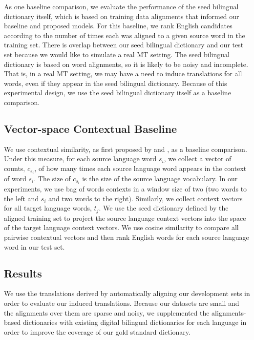 \documentclass[11pt,letterpaper]{article}
\begin{document}
As one baseline comparison, we evaluate the performance of the seed bilingual dictionary itself, which is based on training data alignments that informed our baseline and proposed models.
For this baseline, we rank English candidates according to the number of times each was aligned to a given source word in the training set.
There is overlap between our seed bilingual dictionary and our test set because we would like to simulate a real MT setting.
The seed bilingual dictionary is based on word alignments, so it is likely to be noisy and incomplete. 
That is, in a real MT setting, we may have a need to induce translations for all words, even if they appear in the seed bilingual dictionary.
Because of this experimental design, we use the seed bilingual dictionary itself as a baseline comparison.


\subsection{Vector-space Contextual Baseline}\label{sec:contextbaseline}
We use contextual similarity, as first proposed by  and , as a baseline comparison. 
Under this measure, for each source language word $s_i$, we collect a vector of counts, $c_{s_i}$, of how many times each source language word appears in the context of word $s_i$. 
The size of $c_{s_i}$ is the size of the source language vocabulary.
In our experiments, we use bag of words contexts in a window size of two (two words to the left and $s_i$ and two words to the right). 
Similarly, we collect context vectors for all target language words, $t_j$. 
We use the seed dictionary defined by the aligned training set to project the source language context vectors into the space of the target language context vectors.
We use cosine similarity to compare all pairwise contextual vectors and then rank English words for each source language word in our test set.

\subsection{Results}

We use the translations derived by automatically aligning our development sets in order to evaluate our induced translations.
Because our datasets are small and the alignments over them are sparse and noisy, we supplemented the alignments-based dictionaries with existing digital bilingual dictionaries for each language in order to improve the coverage of our gold standard dictionary.
\end{document}
